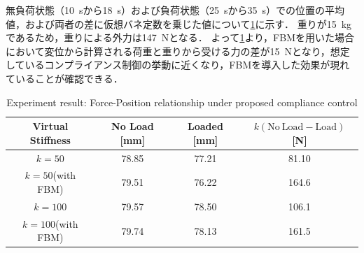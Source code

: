 無負荷状態（\SI{10}{s}から\SI{18}{s}）および負荷状態（\SI{25}{s}から\SI{35}{s}）での位置の平均値，および両者の差に仮想バネ定数を乗じた値について\tabname\ref{tab:position}に示す．
重りが\SI{15}{kg}であるため，重りによる外力は\SI{147}{N}となる．
よって\tabname\ref{tab:position}より，FBMを用いた場合において変位から計算される荷重と重りから受ける力の差が\SI{15}{N}となり，想定しているコンプライアンス制御の挙動に近くなり，FBMを導入した効果が現れていることが確認できる．

\begin{table}[t]
    \caption{Experiment result: Force-Position relationship under proposed compliance control}
    \label{tab:position}
    \centering
    \begin{tabular}{cccc}
    Virtual Stiffness&No Load [mm] &Loaded [mm] &$k(\mathrm{No~Load} - \mathrm{Load})$ [N]\\ \hline
        $k=50$&78.85&77.21&81.10\\
        $k=50$(with FBM)&79.51&76.22&164.6\\
        $k=100$&79.57&78.50&106.1\\
        $k=100$(with FBM)&79.74&78.13&161.5\\ \hline
    \end{tabular}
\end{table}
